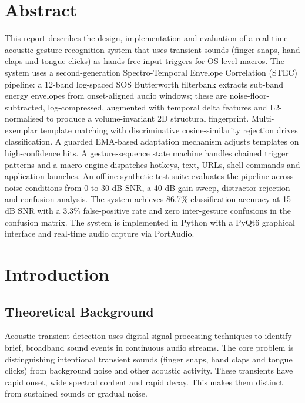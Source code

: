 \documentclass[12pt,a4paper]{article}
\begin{document}
\section*{Abstract}
This report describes the design, implementation and evaluation of a real-time acoustic gesture recognition system that uses transient sounds (finger snaps, hand claps and tongue clicks) as hands-free input triggers for OS-level macros. The system uses a second-generation Spectro-Temporal Envelope Correlation (STEC) pipeline: a 12-band log-spaced SOS Butterworth filterbank extracts sub-band energy envelopes from onset-aligned audio windows; these are noise-floor-subtracted, log-compressed, augmented with temporal delta features and L2-normalised to produce a volume-invariant 2D structural fingerprint. Multi-exemplar template matching with discriminative cosine-similarity rejection drives classification. A guarded EMA-based adaptation mechanism adjusts templates on high-confidence hits. A gesture-sequence state machine handles chained trigger patterns and a macro engine dispatches hotkeys, text, URLs, shell commands and application launches. An offline synthetic test suite evaluates the pipeline across noise conditions from 0 to 30 dB SNR, a 40 dB gain sweep, distractor rejection and confusion analysis. The system achieves 86.7\% classification accuracy at 15 dB SNR with a 3.3\% false-positive rate and zero inter-gesture confusions in the confusion matrix. The system is implemented in Python with a PyQt6 graphical interface and real-time audio capture via PortAudio.

\newpage

\tableofcontents
\newpage

\section{Introduction}

\subsection{Theoretical Background}

Acoustic transient detection uses digital signal processing techniques to identify brief, broadband sound events in continuous audio streams. The core problem is distinguishing intentional transient sounds (finger snaps, hand claps and tongue clicks) from background noise and other acoustic activity. These transients have rapid onset, wide spectral content and rapid decay. This makes them distinct from sustained sounds or gradual noise.
\end{document}
